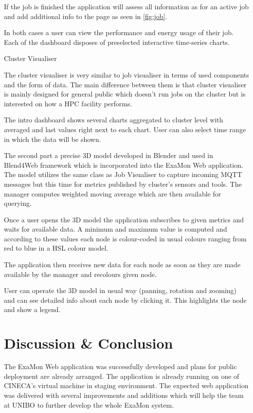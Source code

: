 \documentclass[a4paper, twoside]{article}
\newcommand{\highlight}[1]{\textcolor{prace-orange}{#1}}
\newcommand{\itempar}[1]{\noindent\highlight{\textsf #1}\par\noindent}
\begin{document}
\begin{multicols}{3}
If the job is finished the application will assess all information as for an active job and add additional info to the page as seen in \ref{fig:job}.

In both cases a user can view the performance and energy usage of their job. Each of the dashboard disposes of preselected interactive time-series charts.

\itempar{Cluster Visualiser}
The cluster visualiser is very similar to job visualiser in terms of used components and the form of data. The main difference between them is that cluster visualiser is mainly designed for general public which doesn't run jobs on the cluster but is interested on how a HPC facility performs.

The intro dashboard shows several charts aggregated to cluster level with averaged and last values right next to each chart. User can also select time range in which the data will be shown.

The second part a precise 3D model developed in Blender and used in Blend4Web framework which is incorporated into the ExaMon Web application. The model utilizes the same class as Job Visualiser to capture incoming MQTT messages but this time for metrics published by cluster's sensors and tools. The manager computes weighted moving average which are then available for querying.

Once a user opens the 3D model the application subscribes to given metrics and waits for available data. A minimum and maximum value is computed and according to these values each node is colour-coded in usual colours ranging from red to blue in a HSL colour model.

The application then receives new data for each node as soon as they are made available by the manager and recolours given node.

User can operate the 3D model in usual way (panning, rotation and zooming) and can see detailed info about each node by clicking it. This highlights the node and show a legend.

\section*{Discussion \& Conclusion}
The ExaMon Web application was successfully developed and plans for public deployment are already arranged. The application  is already running on one of CINECA's virtual machine in staging environment. The expected web application was delivered with several improvements and additions which will help the team at UNIBO to further develop the whole ExaMon system.


\end{multicols}
\end{document}
